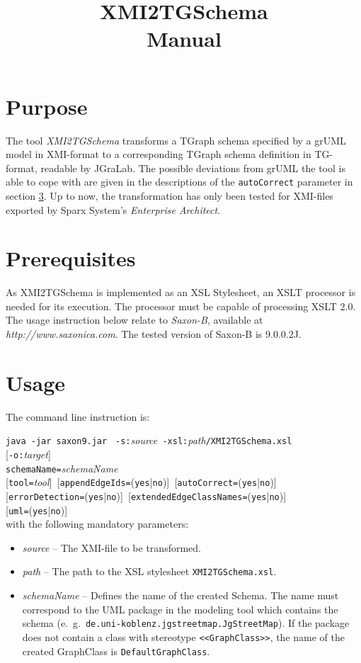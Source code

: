 \documentclass[a4paper]{article}
\title{\LARGE XMI2TGSchema\\Manual}
\begin{document}
	\maketitle
	\vspace{-6pt}
	
	\section{Purpose}
	The tool \emph{XMI2TGSchema} transforms a TGraph schema specified by a grUML model in XMI-format to a corresponding TGraph schema definition in TG-format, readable by JGraLab. The possible deviations from grUML the tool is able to cope with are given in the descriptions of the \texttt{autoCorrect} parameter in section \ref{sec:Usage}. Up to now, the transformation has only been tested for XMI-files exported by Sparx System's \emph{Enterprise Architect}.
	
	\section{Prerequisites}
	As XMI2TGSchema is implemented as an XSL Stylesheet, an XSLT processor is needed for its execution. The processor must be capable of processing XSLT 2.0. The usage instruction below relate to \emph{Saxon-B}, available at \emph{http://www.saxonica.com}. The tested version of Saxon-B is 9.0.0.2J.
	
	\section{Usage} \label{sec:Usage}
	The command line instruction is:
	
	\texttt{java -jar saxon9.jar } \texttt{-s:}\emph{source}\texttt{ -xsl:}\emph{path}\texttt{/XMI2TGSchema.xsl} \\
	\mbox{[}\texttt{-o:}\emph{target}] \\
	\texttt{schemaName=}\emph{schemaName} \\
	\mbox{[}\texttt{tool=}\emph{tool}]\texttt{ }[\texttt{appendEdgeIds=}(\texttt{yes}|\texttt{no})]\texttt{ }[\texttt{autoCorrect=}(\texttt{yes}|\texttt{no})] \\
	\mbox{[}\texttt{errorDetection=}(\texttt{yes}|\texttt{no})]\texttt{ }[\texttt{extendedEdgeClassNames=}(\texttt{yes}|\texttt{no})] \\
	\mbox{[}\texttt{uml=}(\texttt{yes}|\texttt{no})] \\

	with the following mandatory parameters:
	\begin{itemize}
		\item \emph{source} -- The XMI-file to be transformed.
		\item \emph{path} -- The path to the XSL stylesheet \texttt{XMI2TGSchema.xsl}.
		\item \emph{schemaName} -- Defines the name of the created Schema. The name must correspond to the UML package in the modeling tool which contains the schema (e.\ g.\ \texttt{de.uni-koblenz.jgstreetmap.JgStreetMap}). If the package does not contain a class with stereotype \texttt{<<GraphClass>>}, the name of the created GraphClass is \texttt{DefaultGraphClass}.
	\end{itemize}
	
\end{document}
